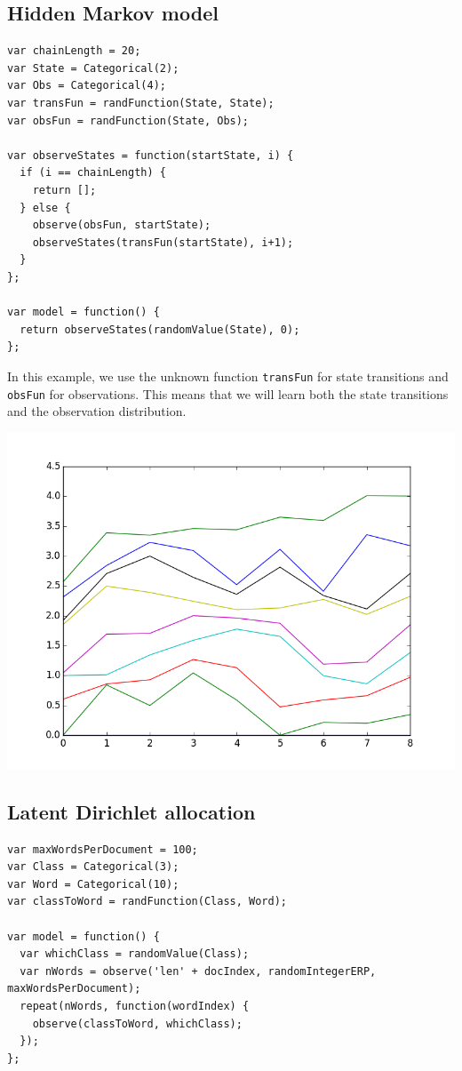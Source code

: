 \documentclass{article}
\begin{document}
  \subsection{Hidden Markov model}
{\small
\begin{lstlisting}
var chainLength = 20;
var State = Categorical(2);
var Obs = Categorical(4);
var transFun = randFunction(State, State);
var obsFun = randFunction(State, Obs);

var observeStates = function(startState, i) {
  if (i == chainLength) {
    return [];
  } else {
    observe(obsFun, startState);
    observeStates(transFun(startState), i+1);
  }
};

var model = function() {
  return observeStates(randomValue(State), 0);
};
\end{lstlisting}
}

In this example, we use the unknown function \texttt{transFun} for state transitions and \texttt{obsFun} for observations.  This means that we will learn both the state transitions and the observation distribution.

\begin{center}
  \includegraphics[scale=0.5]{../plots/accuracy_hmm.png}
\end{center}

\subsection{Latent Dirichlet allocation}
{\small
\begin{lstlisting}
var maxWordsPerDocument = 100;
var Class = Categorical(3);
var Word = Categorical(10);
var classToWord = randFunction(Class, Word);

var model = function() {
  var whichClass = randomValue(Class);
  var nWords = observe('len' + docIndex, randomIntegerERP, maxWordsPerDocument);
  repeat(nWords, function(wordIndex) {
    observe(classToWord, whichClass);
  });
};
\end{lstlisting}
}
\end{document}
